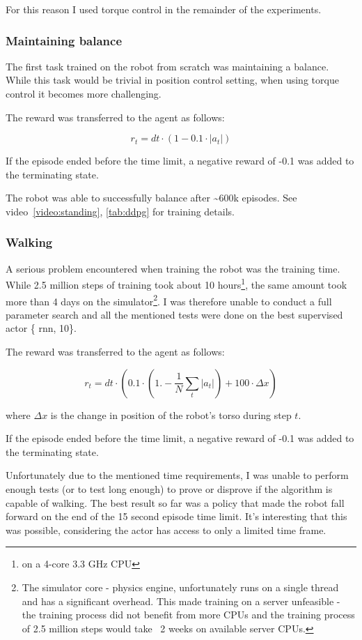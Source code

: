 For this reason I used torque control in the remainder of the experiments.

\subsubsection{Maintaining balance}
The first task trained on the robot from scratch was maintaining a balance. While this task would be trivial in position control setting, when using torque control it becomes more challenging.

The reward was transferred to the agent as follows:

$$r_t = dt \cdot (1 - 0.1\cdot |a_t|)$$

If the episode ended before the time limit, a negative reward of -0.1 was added to the terminating state.

The robot was able to successfully balance after \textasciitilde 600k episodes. See video~\ref{video:standing}, \ref{tab:ddpg} for training details.

\subsubsection{Walking}
A serious problem encountered when training the robot was the training time. While 2.5 million steps of training took about 10 hours\footnote{on a 4-core 3.3 GHz CPU}, the same amount took more than 4 days on the simulator\footnote{The simulator core - physics engine, unfortunately runs on a single thread and has a significant overhead. This made training on a server unfeasible - the training process did not benefit from more CPUs and the training process of 2.5 million steps would take ~2 weeks on available server CPUs.}. I was therefore unable to conduct a full parameter search and all the mentioned tests were done on the best supervised actor \{ rnn, 10\}.

The reward was transferred to the agent as follows:

$$r_t = dt \cdot (0.1 \cdot (1.-\frac{1}{N}\sum_t|a_t|)+100\cdot\Delta x)$$

where $\Delta x$ is the change in position of the robot's torso during step $t$.

If the episode ended before the time limit, a negative reward of -0.1 was added to the terminating state.

Unfortunately due to the mentioned time requirements, I was unable to perform enough tests (or to test long enough) to prove or disprove if the algorithm is capable of walking. The best result so far was a policy that made the robot fall forward on the end of the 15 second episode time limit. It's interesting that this was possible, considering the actor has access to only a limited time frame.